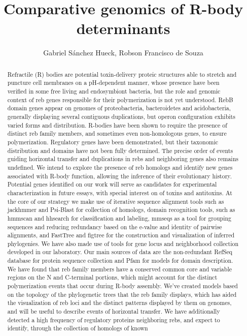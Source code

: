 \documentclass[twoside]{article}
\title{\vspace{-15mm}\fontsize{24pt}{10pt}\selectfont\textbf{ Comparative genomics of R-body determinants }} %
\author{ Gabriel S\'anchez Hueck, Robson Francisco de Souza }
\affil{  }
\date{}
\begin{document}
  
  
  \maketitle %
  
  
  \thispagestyle{fancy} %
  
  
  \begin{abstract}
  Refractile (R) bodies are potential toxin-delivery proteic structures able to stretch and puncture cell membranes on a pH-dependent manner,  whose presence have been verified in some free living and endosymbiont bacteria,  but the role and genomic context of reb genes responsible for their polymerization is not yet understood. RebB domain genes appear on genomes of proteobacteria,  bacteroidetes and acidobacteria,  generally displaying several contiguous duplications,  but operon configuration exhibits varied forms and distribution. R-bodies have been shown to require the presence of distinct reb family members,  and sometimes even non-homologous genes,  to ensure polymerization. Regulatory genes have been demonstrated,  but their taxonomic distribution and domains have not been fully determined. The precise order of events guiding horizontal transfer and duplications in rebs and neighboring genes also remains undefined. We intend to explore the presence of reb homologs and identify new genes associated with R-body function,  allowing the inference of their evolutionary history. Potential genes identified on our work will serve as candidates for experimental characterization in future essays,  with special interest on of toxins and antitoxins. At the core of our strategy we make use of iterative sequence alignment tools such as jackhmmer and Psi-Blast for collection of homologs,  domain recognition tools,  such as hmmscan and hhsearch for classification and labeling,  mmseqs as a tool for grouping sequences and reducing redundancy based on the e-value and identity of pairwise alignments,  and FastTree and figtree for the construction and visualization of inferred phylogenies. We have also made use of tools for gene locus and neighborhood collection developed in our laboratory. Our main sources of data are the non-redundant RefSeq database for protein sequence collection and Pfam for models for domain description. We have found that reb family members have a conserved common core and variable regions on the N and C-terminal portions,  which might account for the distinct polymerization events that occur during R-body assembly. We've created models based on the topology of the phylogenetic trees that the reb family displays,  which has aided the visualization of reb loci and the distinct patterns displayed by them on genomes,  and will be useful to describe events of horizontal transfer. We have additionally detected a high frequency of regulatory proteins neighboring rebs,  and expect to identify,  through the collection of homologs of known 
\end{abstract}
\end{document}
